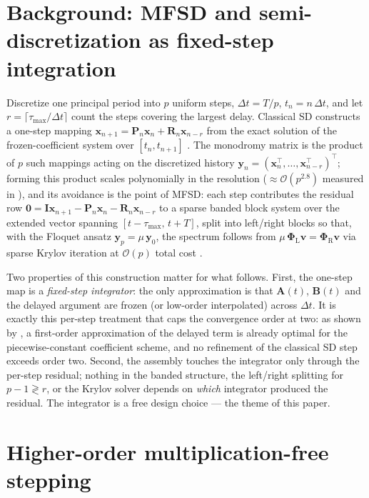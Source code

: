 \documentclass[Afour,sageh,times]{sagej}
\begin{document}
\section{Background: MFSD and semi-discretization as fixed-step integration}
\label{sec:background}

Discretize one principal period into $p$ uniform steps,
$\Delta t = T/p$, $t_n = n\,\Delta t$, and let
$r = \lceil \tau_{\max}/\Delta t\rceil$ count the steps covering the largest
delay. Classical SD constructs a one-step mapping
$\mathbf{x}_{n+1} = \mathbf{P}_n \mathbf{x}_n + \mathbf{R}_n
\mathbf{x}_{n-r}$ from the exact solution of the frozen-coefficient system
over $[t_n, t_{n+1}]$ \citep{Insperger2011}. The monodromy matrix is the
product of $p$ such mappings acting on the discretized history
$\mathbf{y}_n = (\mathbf{x}_n^\top,\ldots,\mathbf{x}_{n-r}^\top)^\top$;
forming this product scales polynomially in the resolution
($\approx\mathcal{O}(p^{2.8})$ measured in \citealp{Bachrathy2026}),
and its avoidance is the point of MFSD: each step contributes the residual
row $\mathbf{0} = \mathbf{I}\mathbf{x}_{n+1} - \mathbf{P}_n\mathbf{x}_n -
\mathbf{R}_n\mathbf{x}_{n-r}$ to a sparse banded block system over the
extended vector spanning $[t-\tau_{\max},\, t+T]$, split into left/right
blocks so that, with the Floquet ansatz
$\mathbf{y}_p = \mu\,\mathbf{y}_0$, the spectrum follows from
$\mu\,\mathbf{\Phi}_\mathrm{L}\mathbf{v} = \mathbf{\Phi}_\mathrm{R}\mathbf{v}$
via sparse Krylov iteration \citep{Haegeman2021} at
$\mathcal{O}(p)$ total cost \citep{Bachrathy2026}.

Two properties of this construction matter for what follows. First, the
one-step map is a \emph{fixed-step integrator}: the only approximation is
that $\mathbf{A}(t)$, $\mathbf{B}(t)$ and the delayed argument are frozen (or
low-order interpolated) across $\Delta t$. It is exactly this per-step
treatment that caps the convergence order at two: as shown by
\citet{Insperger2008}, a first-order approximation of the delayed term is
already optimal for the piecewise-constant coefficient scheme, and no
refinement of the classical SD step exceeds order two. Second, the assembly
touches the integrator only through the per-step residual; nothing in the
banded structure, the left/right splitting for $p-1 \gtrless r$, or the
Krylov solver depends on \emph{which} integrator produced the residual. The
integrator is a free design choice --- the theme of this paper.

\section{Higher-order multiplication-free stepping}
\label{sec:method}
\end{document}
